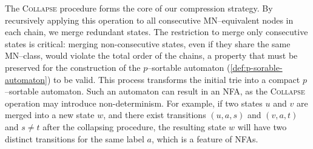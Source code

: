 \begin{comment}
    \label{def:collapsing_pair}
    
    Let $N = (Q, \Sigma, \delta, q_0, F)$ be an NFA. The operation \textbf{$collapse(u,v)$} is defined for two states $u, v \in Q$ if and only if they are MN-equivalent, and transforms $N$ into a new automaton $N'=(Q', \Sigma, \delta', q_0', F')$ as follows:
    \begin{enumerate}[leftmargin=25pt]
        \item \textbf{State Merging:} A new state $w$ is created to replace $u$ and $v$. The new set of states is $Q' = (Q \setminus \{u, v\}) \cup \{w\}$.
        \item \textbf{Transition Redirection:} Let $\phi: Q \to Q'$ be a state mapping function defined as follows:
        \[
            \phi(z) = 
            \begin{cases} 
                w & \text{if } z \in \{u, v\} \\
                z & \text{otherwise}
            \end{cases}
        \]
        
        The new transition function $\delta': Q' \times \Sigma \to Q'$ is then formed by applying this mapping to the source and destination states of every transition in $\delta$:
        \[
            \delta' = \{ (\phi(q), a, \phi(r)) \mid (q, a, r) \in \delta \}
        \]
        \item \textbf{Initial and Final States:} The new initial state is $q_0' = \phi(q_0)$, and the new set of final states is $F' = \{ \phi(f) \mid f \in F \}$.
    \end{enumerate}
\end{comment}

The \textsc{Collapse} procedure forms the core of our compression strategy. By recursively applying this operation to all consecutive MN--equivalent nodes in each chain, we merge redundant states. The restriction to merge only consecutive states is critical: merging non-consecutive states, even if they share the same MN--class, would violate the total order of the chains, a property that must be preserved for the construction of the $p$--sortable automaton (\cref{def:p-sorable-automaton}) to be valid. This process transforms the initial trie into a compact $p$--sortable automaton. Such an automaton can result in an NFA, as the \textsc{Collapse} operation may introduce non-determinism. For example, if two states $u$ and $v$ are merged into a new state $w$, and there exist transitions $(u, a, s)$ and $(v, a, t)$ and $s \neq t$ after the collapsing procedure, the resulting state $w$ will have two distinct transitions for the same label $a$, which is a feature of NFAs.

